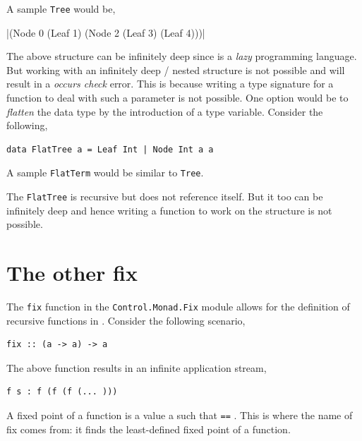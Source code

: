 \documentclass[thesis-solanki.tex]{subfiles}
\begin{document}
A sample \texttt{Tree} would be,

|(Node 0 (Leaf 1) (Node 2 (Leaf 3) (Leaf 4)))|

The above structure can be infinitely deep since  is a \textit{lazy} programming language. But working with an infinitely deep / nested 
structure is not possible and will result in a \textit{occurs check} error. This is because writing a type signature for a function to deal with such a
parameter is not possible. One option would be to \textit{flatten} the data type by the introduction of a type variable. Consider the following,

\begin{verbatim}
data FlatTree a = Leaf Int | Node Int a a
\end{verbatim}  

A sample \texttt{FlatTerm} would be similar to \texttt{Tree}. 

The \texttt{FlatTree} is recursive but does not reference itself. But it too can be infinitely deep and hence writing a function to work on the structure
is not possible.  

\section{The other fix}

The \texttt{fix} function in the \texttt{Control.Monad.Fix} module allows for the definition of recursive functions in . Consider the 
following scenario,

\begin{verbatim}
fix :: (a -> a) -> a
\end{verbatim}
The above function results in an infinite application stream,

\begin{verbatim}
f s : f (f (f (... )))
\end{verbatim} 

A fixed point of a function  is a value a such that   \Verb!==! . This is where the name of fix comes from: it finds the least-defined fixed 
point of a function.
\end{document}
